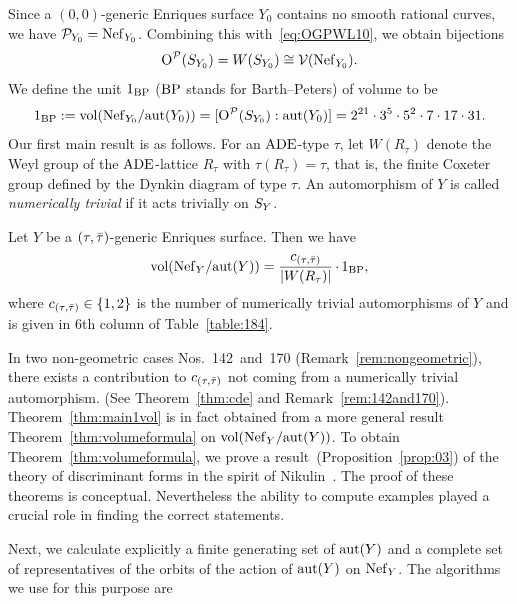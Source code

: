 \documentclass{amsart}
\numberwithin{procedure}{section}
\begin{document}
%
Since  a $(0,0)$-generic  Enriques surface
$Y_0$ contains no smooth rational curves,
we have $\mathord{\mathcal P}_{Y_0}=\mathord{\rm Nef}_{Y_0}$.
Combining this with~\eqref{eq:OGPWL10}, 
we obtain  bijections
\[
\mathord{\mathrm{O}}^{\mathord{\mathcal P}}(S_{Y_0})=W(S_{Y_0})\cong   \mathord{\mathcal V}(\mathord{\rm Nef}_{Y_0}).
\]
We  define the unit $1_{\mathord{\rm{BP}}}$ ($\mathord{\rm{BP}}$ stands for Barth--Peters)
of volume  to be
\[
1_{\mathord{\rm{BP}}}:=\mathord{\rm{vol}}(\mathord{\rm Nef}_{Y_0}/\mathord{\rm{aut}}(Y_0))=[\mathord{\mathrm{O}}^{\mathord{\mathcal P}}(S_{Y_0}): \mathord{\rm{aut}}(Y_0)]
=2^{21}\cdot 3^5\cdot 5^2\cdot 7 \cdot 17\cdot 31.
\]
%
Our first main result is as follows.
For an $\mathord{\rm ADE}$-type $\tau$, let $W(R_{\tau})$ denote the Weyl group
of the $\mathord{\rm ADE}$-lattice $R_{\tau}$ with $\tau(R_{\tau})=\tau$,
that is, the finite Coxeter group
defined by the Dynkin diagram of type $\tau$.
%
An automorphism of $Y$ is called \emph{numerically trivial} if it acts trivially on $S_{Y}$.
%
\begin{theorem}\label{thm:main1vol}
Let $Y$ be a $(\tau, \bar{\tau})$-generic Enriques surface.
Then we have
\[
\vol (\NefY/ \aut(Y))=\frac{c_{(\tau, \taubar)}}{|W(R_{\tau})|}  \hbox{\,$\cdot\, 1_{\BP}$}, %
\]
where $c_{(\tau, \bar{\tau})}\in \{1, 2\}$ is the number of numerically trivial automorphisms of $Y$ and is given in $6$th column of Table~\ref{table:184}.
\end{theorem}
%
In two  %
non-geometric cases Nos.~142~and~170 (Remark~\ref{rem:nongeometric}),  there exists a contribution to $c_{(\tau,\bar{\tau})}$ not coming from a numerically trivial automorphism. 
(See Theorem~\ref{thm:cde} and Remark~\ref{rem:142and170}).
Theorem~\ref{thm:main1vol} is in fact obtained from a more general result
Theorem~\ref{thm:volumeformula} on  $\mathord{\rm{vol}} (\mathord{\rm Nef}_{Y}/ \mathord{\rm{aut}}(Y))$. %
To obtain Theorem~\ref{thm:volumeformula}, we prove
a result~(Proposition~\ref{prop:03})
of the theory of discriminant forms 
in the spirit of Nikulin~\cite{Nikulin79}.
The proof of these theorems is conceptual.
Nevertheless the ability to compute examples played a crucial role in finding the correct statements.
\par
Next,  we calculate  explicitly 
a finite generating set  of $\mathord{\rm{aut}}(Y)$ 
and a complete set of representatives 
of the orbits of the action of $\mathord{\rm{aut}}(Y)$ on $\mathord{\rm Nef}_{Y}$.
The algorithms  we use for this purpose are
\end{document}

